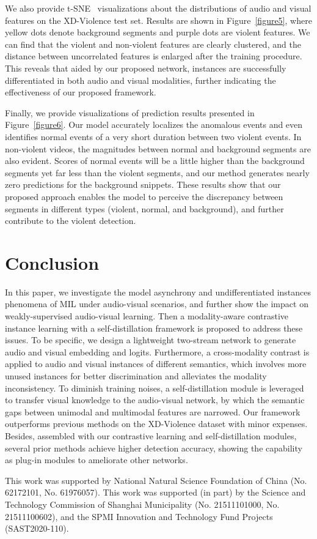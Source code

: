 \documentclass[sigconf]{acmart}
\begin{document}
We also provide t-SNE~\cite{van2008visualizing} visualizations about the distributions of audio and visual features on the XD-Violence test set. Results are shown in Figure~\ref{figure5}, where yellow dots denote background segments and purple dots are violent features. We can find that the violent and non-violent features are clearly clustered, and the distance between uncorrelated features is enlarged after the training procedure. This reveals that aided by our proposed network, instances are successfully differentiated in both audio and visual modalities, further indicating the effectiveness of our proposed framework.

Finally, we provide visualizations of prediction results presented in Figure~\ref{figure6}. Our model accurately localizes the anomalous events and even identifies normal events of a very short duration between two violent events. In non-violent videos, the magnitudes between normal and background segments are also evident. Scores of normal events will be a little higher than the background segments yet far less than the violent segments, and our method generates nearly zero predictions for the background snippets. These results show that our proposed approach enables the model to perceive the discrepancy between segments in different types (violent, normal, and background), and further contribute to the violent detection.

\section{Conclusion}
In this paper, we investigate the model asynchrony and undifferentiated instances phenomena of MIL under audio-visual scenarios, and further show the impact on weakly-supervised audio-visual learning. Then a modality-aware contrastive instance learning with a self-distillation framework is proposed to address these issues. To be specific, we design a lightweight two-stream network to generate audio and visual embedding and logits. Furthermore, a cross-modality contrast is applied to audio and visual instances of different semantics, which involves more unused instances for better discrimination and alleviates the modality inconsistency. To diminish training noises, a self-distillation module is leveraged to transfer visual knowledge to the audio-visual network, by which the semantic gaps between unimodal and multimodal features are narrowed. Our framework outperforms previous methods on the XD-Violence dataset with minor expenses. Besides, assembled with our contrastive learning and self-distillation modules, several prior methods achieve higher detection accuracy, showing the capability as plug-in modules to ameliorate other networks.

\begin{acks}
This work was supported by National Natural Science Foundation of China (No. 62172101, No. 61976057). This work was supported (in part) by the Science and Technology Commission of Shanghai Municipality (No. 21511101000, No. 21511100602), and the SPMI Innovation and Technology Fund Projects (SAST2020-110).

\end{acks}

\clearpage


\end{document}
